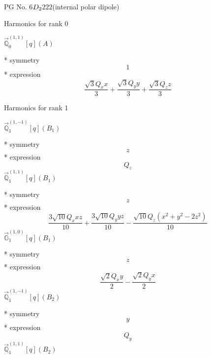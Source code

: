 \documentclass[fleqn,8pt]{jsarticle}
\begin{document}
\setcounter{MaxMatrixCols}{32}

\renewcommand{\tablename}{Table~}
\renewcommand{\figurename}{Figure~}
\begin{center}
\LARGE
PG No. 6\quad$D_{\rm 2}$\quad$222$\quad[ orthorhombic ] (internal polar dipole)
\end{center}

\noindent * Harmonics for rank 0

\noindent\quad $\vec{\mathbb{Q}}_{0}^{(1,1)}[q](A)$

\noindent\quad ** symmetry
\begin{dmath*}
1
\end{dmath*}
\noindent\quad ** expression
\begin{dmath*}
\frac{\sqrt{3} Q_{x} x}{3} + \frac{\sqrt{3} Q_{y} y}{3} + \frac{\sqrt{3} Q_{z} z}{3}
\end{dmath*}

\noindent * Harmonics for rank 1

\noindent\quad $\vec{\mathbb{Q}}_{1}^{(1,-1)}[q](B_{1})$

\noindent\quad ** symmetry
\begin{dmath*}
z
\end{dmath*}
\noindent\quad ** expression
\begin{dmath*}
Q_{z}
\end{dmath*}
\noindent\quad $\vec{\mathbb{Q}}_{1}^{(1,1)}[q](B_{1})$

\noindent\quad ** symmetry
\begin{dmath*}
z
\end{dmath*}
\noindent\quad ** expression
\begin{dmath*}
\frac{3 \sqrt{10} Q_{x} x z}{10} + \frac{3 \sqrt{10} Q_{y} y z}{10} - \frac{\sqrt{10} Q_{z} \left(x^{2} + y^{2} - 2 z^{2}\right)}{10}
\end{dmath*}
\noindent\quad $\vec{\mathbb{G}}_{1}^{(1,0)}[q](B_{1})$

\noindent\quad ** symmetry
\begin{dmath*}
z
\end{dmath*}
\noindent\quad ** expression
\begin{dmath*}
\frac{\sqrt{2} Q_{x} y}{2} - \frac{\sqrt{2} Q_{y} x}{2}
\end{dmath*}
\noindent\quad $\vec{\mathbb{Q}}_{1}^{(1,-1)}[q](B_{2})$

\noindent\quad ** symmetry
\begin{dmath*}
y
\end{dmath*}
\noindent\quad ** expression
\begin{dmath*}
Q_{y}
\end{dmath*}
\noindent\quad $\vec{\mathbb{Q}}_{1}^{(1,1)}[q](B_{2})$
\end{document}
